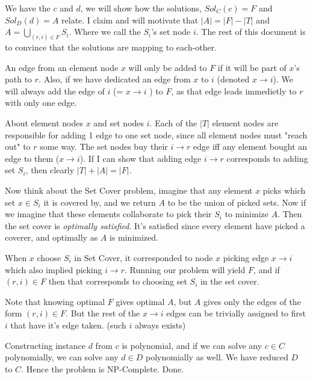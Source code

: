\documentclass[a4paper,11pt]{article}
\begin{document}
We have the $c$ and $d$, we will show how the solutions,
$Sol_C(c) = F$ and $Sol_D(d) = A$ relate.
I claim and will motivate that $ |A| = |F| - |T| $ and
$ A = \bigcup_{(r,i) \in F} S_i$. Where we call the $S_i$'s set node
$i$. The rest of this document is to
convince that the solutions
are mapping to each-other.

An edge from an element node $x$ will only be added
to $F$ if it will be part of $x$'s path to $r$.
Also, if we have dedicated an edge from $x$ to $i$ (denoted $x \to i$).
We will always add the edge of $i$ (= $x \to i$ ) to $F$,
as that edge leads immedietly to $r$ with only one edge.

About element nodes $x$ and set nodes $i$. Each of the $|T|$
element nodes are
responsible for adding 1 edge to one set node, since all element
nodes must "reach out" to $r$ some way.
The set nodes buy their $i \to r$ edge iff any element
bought an edge to them ($x \to i$). If I can show
that adding edge $i \to r$ corresponds to adding set $S_i$,
then clearly $|T| + |A| = |F|$.

Now think about the Set Cover problem, imagine
that any element $x$
picks which set $x \in S_i$ it is covered by, and we return
$A$ to be the union of picked sets. Now if we
imagine that these elements collaborate to pick their $S_i$
to minimize $A$. Then the set cover is \emph{optimally satisfied}.
It's satisfied since every element have picked
a coverer, and optimally as $A$ is minimized.

When $x$ choose $S_i$ in Set Cover, it corresponded to
node $x$ picking edge $x \to i$ which also implied
picking $i \to r$. Running our problem will yield
$F$, and if $(r,i) \in F$ then that corresponds to
choosing set $S_i$ in the set cover.

Note that knowing optimal $F$ gives optimal $A$,
but $A$ gives only the edges of the form $(r, i) \in F$.
But the rest of the $x \to i$ edges can be trivially
assigned to first $i$ that have it's edge taken.
(such $i$ always exists)

Constructing instance $d$ from $c$ is polynomial,
and if we can solve any $c \in C$ polynomially, we can solve
any $d \in D$ polynomially as well. We have reduced $D$ to $C$.
Hence the problem is NP-Complete. Done.
\end{document}

